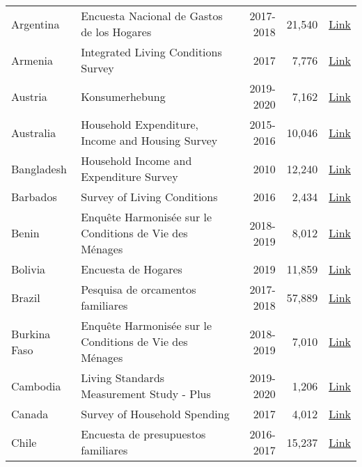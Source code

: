 \begin{ThreePartTable}
\begin{longtable}[t]{l|p{8cm}|r|r|c}
        Argentina & Encuesta Nacional de Gastos de los Hogares & 2017-2018 &  21,540  & \href{https://www.indec.gob.ar/indec/web/Nivel4-Tema-4-45-151}{Link} \\ 
        Armenia & Integrated Living Conditions Survey & 2017 &  7,776  & \href{https://microdata.worldbank.org/index.php/catalog/3591}{Link} \\ 
        Austria & Konsumerhebung & 2019-2020 &  7,162  & \href{https://www.statistik.at/ueber-uns/erhebungen/personen-und-haushaltserhebungen/konsumerhebung}{Link} \\ 
        Australia & Household Expenditure, Income and Housing Survey & 2015-2016 & 10,046 & \href{https://www.abs.gov.au/AUSSTATS/abs@.nsf/Lookup/6503.0Main+Features12015-16?OpenDocument}{Link}  \\
        Bangladesh & Household Income and Expenditure Survey & 2010 &  12,240  & \href{http://data.bbs.gov.bd/index.php/catalog/67}{Link} \\ 
        Barbados & Survey of Living Conditions & 2016 &  2,434  & \href{https://publications.iadb.org/en/barbados-survey-living-conditions-2016}{Link} \\ 
        Benin & Enquête Harmonisée sur le Conditions de Vie des Ménages & 2018-2019 &  8,012  & \href{https://microdata.worldbank.org/index.php/catalog/4291}{Link} \\ 
        Bolivia & Encuesta de Hogares & 2019 &  11,859  & \href{https://www.ine.gob.bo/index.php/estadisticas-sociales/vivienda-y-servicios-basicos/encuestas-de-hogares-vivienda/}{Link} \\ 
        Brazil & Pesquisa de orcamentos familiares & 2017-2018 &  57,889  & \href{https://www.ibge.gov.br/en/statistics/social/population/25610-pof-2017-2018-pof-en.html?=\&t=downloads}{Link} \\ 
        Burkina Faso & Enquête Harmonisée sur le Conditions de Vie des Ménages & 2018-2019 &  7,010  & \href{https://microdata.worldbank.org/index.php/catalog/4290}{Link} \\ 
        Cambodia & Living Standards Measurement Study - Plus & 2019-2020 &  1,206  & \href{https://microdata.worldbank.org/index.php/catalog/study/KHM\_2019\_LSMS-PLUS\_v02\_M}{Link} \\ 
        Canada & Survey of Household Spending & 2017 &  4,012  & \href{https://www150.statcan.gc.ca/n1/en/catalogue/62M0004X}{Link} \\ 
        Chile & Encuesta de presupuestos familiares & 2016-2017 &  15,237  & \href{https://www.ine.cl/estadisticas/sociales/ingresos-y-gastos/encuesta-de-presupuestos-familiares}{Link} \\ 

\end{longtable}
\end{ThreePartTable}
